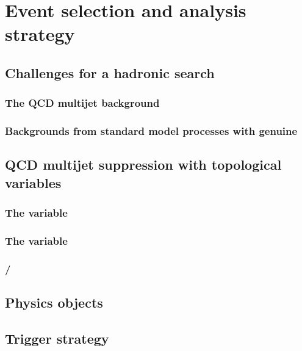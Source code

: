 \chapter{Event selection and analysis strategy}
\label{chap:selection}



\section{Challenges for a hadronic \BSM search}
\label{sec:challenge}

\subsection{The QCD multijet background}

\subsection{Backgrounds from standard model processes with genuine
\MET}

\section{QCD multijet suppression with topological variables}
\label{sec:challenge}

\subsection{The \alphat variable}

\subsection{The \bdphi variable}

\subsection{\MHT/\MET}

\section{Physics objects}

\section{Trigger strategy}

